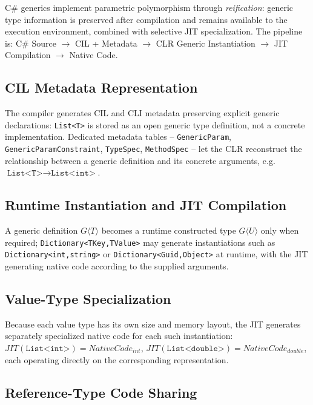 \documentclass[11pt]{report}
\begin{document}
C\# generics implement parametric polymorphism through \emph{reification}:
generic type information is preserved after compilation and remains
available to the execution environment, combined with selective JIT
specialization. The pipeline is: C\# Source $\rightarrow$ CIL + Metadata
$\rightarrow$ CLR Generic Instantiation $\rightarrow$ JIT Compilation
$\rightarrow$ Native Code.

\subsection{CIL Metadata Representation}

The compiler generates CIL and CLI metadata preserving explicit
generic declarations: \texttt{List<T>} is stored as an open generic type
definition, not a concrete implementation. Dedicated metadata tables --
\texttt{GenericParam}, \texttt{GenericParamConstraint}, \texttt{TypeSpec},
\texttt{MethodSpec} -- let the CLR reconstruct the relationship between a
generic definition and its concrete arguments, e.g.\
$\texttt{List<T>} \rightarrow \texttt{List<int>}$.

\subsection{Runtime Instantiation and JIT Compilation}

A generic definition $G\langle T\rangle$ becomes a runtime constructed type
$G\langle U\rangle$ only when required; \texttt{Dictionary<TKey,TValue>} may
generate instantiations such as \texttt{Dictionary<int,string>} or
\texttt{Dictionary<Guid,Object>} at runtime, with the JIT generating native
code according to the supplied arguments.

\subsection{Value-Type Specialization}
\label{CSharpGenerics:RuntimeRepresentation:ValueTypeSpecialization}
Because each value type has its own size and memory layout, the JIT
generates separately specialized native code for each such instantiation:
$JIT(\texttt{List<int>}) = NativeCode_{int}$,
$JIT(\texttt{List<double>}) = NativeCode_{double}$, each operating directly
on the corresponding representation.

\subsection{Reference-Type Code Sharing}
\label{CSharpGenerics:RuntimeRepresentation:ReferenceTypeCodeSharing}
\end{document}
